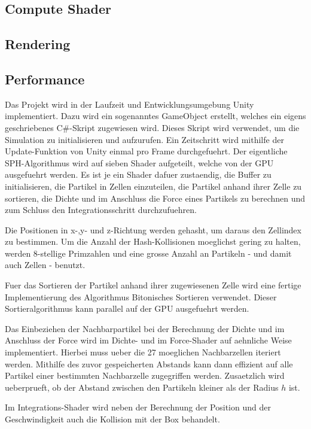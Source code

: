 \documentclass[a4paper]{paper}
\begin{document}
\subsection{Compute Shader}

\subsection{Rendering}
\subsection{Performance}
Das Projekt wird in der Laufzeit und Entwicklungsumgebung Unity implementiert. Dazu wird ein sogenanntes GameObject erstellt, welches ein eigens geschriebenes C\#-Skript zugewiesen wird. Dieses Skript wird verwendet, um die Simulation zu initialisieren und aufzurufen. %
Ein Zeitschritt wird mithilfe der Update-Funktion von Unity einmal pro Frame durchgefuehrt. Der eigentliche SPH-Algorithmus wird auf sieben Shader aufgeteilt, welche von der GPU ausgefuehrt werden. Es ist je ein Shader dafuer zustaendig, die Buffer zu initialisieren, die Partikel in Zellen einzuteilen, die Partikel anhand ihrer Zelle zu sortieren, die Dichte und im Anschluss die Force eines Partikels zu berechnen und zum Schluss den Integrationsschritt durchzufuehren.

Die Positionen in x-,y- und z-Richtung werden gehasht, um daraus den Zellindex zu bestimmen. Um die Anzahl der Hash-Kollisionen moeglichst gering zu halten, werden 8-stellige Primzahlen und eine grosse Anzahl an Partikeln - und damit auch Zellen - benutzt.

Fuer das Sortieren der Partikel anhand ihrer zugewiesenen Zelle wird eine fertige Implementierung des Algorithmus Bitonisches Sortieren verwendet. Dieser Sortieralgorithmus kann parallel auf der GPU ausgefuehrt werden.

Das Einbeziehen der Nachbarpartikel bei der Berechnung der Dichte und im Anschluss der Force wird im Dichte- und im Force-Shader auf aehnliche Weise implementiert. Hierbei muss ueber die 27 moeglichen Nachbarzellen iteriert werden. Mithilfe des zuvor gespeicherten Abstands kann dann effizient auf alle Partikel einer bestimmten Nachbarzelle zugegriffen werden. Zusaetzlich wird ueberprueft, ob der Abstand zwischen den Partikeln kleiner als der Radius $h$ ist.

Im Integrations-Shader wird neben der Berechnung der Position und der Geschwindigkeit auch die Kollision mit der Box behandelt.
\end{document}
